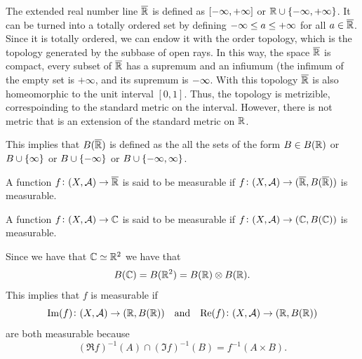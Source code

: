 \documentclass[11pt,a4paper]{article}
\newcommand{\A}{\mathcal A}
\begin{document}
\begin{definition}
  The extended real number line $\overline {\mathbb{R}}$ is defined as $[-\infty,+\infty]$
  or $\mathbb{R} \cup \left\{-\infty,+\infty\right\}$.
  It can be turned into a totally ordered set by defining
  $-\infty \le a \le +\infty$ for all $a \in \overline {\mathbb{R}}$.
  Since it is totally ordered, we can endow it with the order topology,
  which is the topology generated by the subbase of open rays.
  In this way, the space $\overline {\mathbb{R}}$ is compact,
  every subset of $\overline {\mathbb{R}}$ has a supremum and an infiumum
  (the infimum of the empty set is $+\infty$, and its supremum is $-\infty$.
  With this topology $\overline {\mathbb{R}}$ is also homeomorphic to the unit interval
  $[0,1]$.
  Thus, the topology is metrizible, correspoinding to the standard metric
  on the interval.
  However, there is not metric that is an extension of the standard metric on
  $\mathbb{R}$.
\end{definition}
\begin{remark}
  This implies that $B(\overline {\mathbb{R}})$ is defined as the all the sets
  of the form $B \in B(\mathbb{R})$ or $B \cup \left\{\infty\right\}$ or $B \cup \left\{-\infty\right\}$
  or $B \cup \left\{-\infty,\infty\right\}$.
\end{remark}
\begin{remark}
  A function $f \colon (X,\A) \to \overline \R$ is said to be measurable
  if $f \colon (X,\A) \to (\overline \R, B(\overline \R))$ is measurable.

  A function $f \colon (X,\A) \to \C$ is said to be measurable
  if $f \colon (X,\A) \to (\C, B(\C))$ is measurable.

  Since we have that $\mathbb{C} \simeq \mathbb{R}^2$ we have that
  \[
    B(\mathbb{C}) = B(\mathbb{R}^2) = B(\mathbb{R}) \otimes B(\mathbb{R}).
  \]
  This implies that $f$ is measurable if
  \[
    \Im(f) \colon (X,\A) \to (\R,B(\R)) \tand
    \Re(f) \colon (X,\A) \to (\R,B(\R))
  \]
  are both measurable because
  \[
    (\Re f)^{-1}(A) \cap (\Im f)^{-1}(B) = f^{-1}(A \times B).
  \]
\end{remark}
\end{document}
